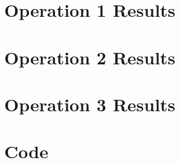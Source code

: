 \documentclass[a4paper, 12pt]{article}
\begin{document}
\section*{Operation 1 Results} \label{sec:results1}


\section*{Operation 2 Results} \label{sec:results2}


\section*{Operation 3 Results} \label{sec:results3}



\newpage
\section*{Code} \label{sec:code}

\end{document}
